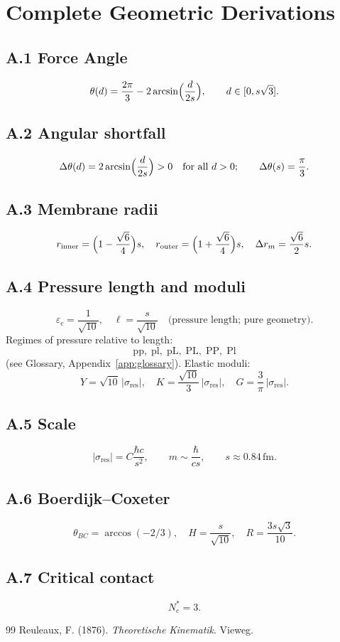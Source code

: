 \section{Complete Geometric Derivations}
\label{app:derivations}

\subsection{A.1 Force Angle}
\[
\theta(d)=\frac{2\pi}{3}-2\arcsin\Bigl(\frac{d}{2s}\Bigr),\qquad d\in[0,s\sqrt{3}].
\]

\subsection{A.2 Angular shortfall}
\[
\Delta\theta(d)=2\arcsin\Bigl(\frac{d}{2s}\Bigr)>0\quad\text{for all }d>0;
\qquad\Delta\theta(s)=\frac{\pi}{3}.
\]

\subsection{A.3 Membrane radii}
\[
r_{\mathrm{inner}}=\Bigl(1-\frac{\sqrt{6}}{4}\Bigr)s,\quad
r_{\mathrm{outer}}=\Bigl(1+\frac{\sqrt{6}}{4}\Bigr)s,\quad
\Delta r_m=\frac{\sqrt{6}}{2}s.
\]

\subsection{A.4 Pressure length and moduli}
\[
\varepsilon_c=\frac{1}{\sqrt{10}},\quad
\ell=\frac{s}{\sqrt{10}}\quad\text{(pressure length; pure geometry)}.
\]
Regimes of pressure relative to length:
\[
\mathrm{pp},\;\mathrm{pl},\;\mathrm{pL},\;\mathrm{PL},\;\mathrm{PP},\;\mathrm{Pl}
\]
(see Glossary, Appendix~\ref{app:glossary}).
Elastic moduli:
\[
Y=\sqrt{10}\,|\sigma_{\mathrm{res}}|,\quad
K=\frac{\sqrt{10}}{3}\,|\sigma_{\mathrm{res}}|,\quad
G=\frac{3}{\pi}\,|\sigma_{\mathrm{res}}|.
\]

\subsection{A.5 Scale}
\[
|\sigma_{\mathrm{res}}|=C\frac{\hbar c}{s^2},\qquad
m\sim\frac{\hbar}{c s},\qquad
s\approx 0.84\,\mathrm{fm}.
\]

\subsection{A.6 Boerdijk--Coxeter}
\[
\theta_{BC}=\arccos(-2/3),\quad H=\frac{s}{\sqrt{10}},\quad R=\frac{3s\sqrt{3}}{10}.
\]

\subsection{A.7 Critical contact}
\[
N_c^*=3.
\]

\begin{thebibliography}{99}
 Reuleaux, F. (1876). \emph{Theoretische Kinematik}. Vieweg.
\end{thebibliography}
